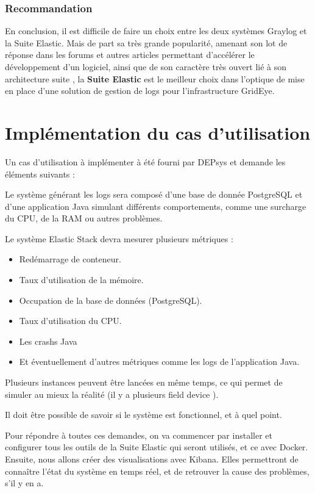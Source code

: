 \documentclass[paper=a4, fontsize=11pt]{scrartcl}
\begin{document}
\subsubsection{Recommandation}
En conclusion, il est difficile de faire un choix entre les deux systèmes Graylog et la Suite Elastic. Mais de part sa très grande popularité, amenant son lot de réponse dans les forums et autres articles permettant d'accélérer le développement d'un logiciel, ainsi que de son caractère très ouvert lié à son \og architecture suite \fg, la \textbf{Suite Elastic} est le meilleur choix dans l'optique de mise en place d'une solution de gestion de logs pour l'infrastructure GridEye.

\newpage

\section{Implémentation du cas d'utilisation}

Un cas d'utilisation à implémenter à été fourni par DEPsys et demande les éléments suivants :

Le système générant les logs sera composé d'une base de donnée PostgreSQL et d'une application Java simulant différents comportements, comme une surcharge du CPU, de la RAM ou autres problèmes.

Le système Elastic Stack devra mesurer plusieurs métriques :
\begin{itemize}
    \item Redémarrage de conteneur.
    \item Taux d'utilisation de la mémoire.
    \item Occupation de la base de données (PostgreSQL).
    \item Taux d'utilisation du CPU.
    \item Les crashs Java
    \item Et éventuellement d'autres métriques comme les logs de l'application Java.
\end{itemize}

Plusieurs instances peuvent être lancées en même temps, ce qui permet de simuler au mieux la réalité (il y a plusieurs \og field device \fg).

Il doit être possible de savoir si le système est fonctionnel, et à quel point.

Pour répondre à toutes ces demandes, on va commencer par installer et configurer tous les outils de la Suite Elastic qui seront utilisés, et ce avec Docker.
Ensuite, nous allons créer des visualisations avec Kibana. Elles permettront de connaître l'état du système en temps réel, et de retrouver la cause des problèmes, s'il y en a.
\end{document}
